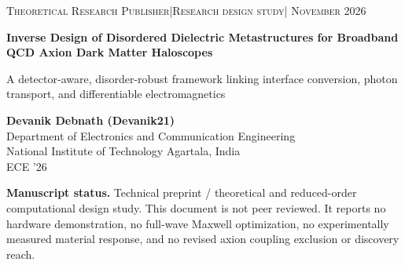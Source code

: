 \documentclass[10.5pt,a4paper]{article}
\begin{document}
\begin{titlepage}
\vspace*{0.25in}
{\small\color{accent}\textsc{Theoretical Research Publisher\quad |\quad Research design study\quad | November 2026}}\\[1.2em]
{\Huge\bfseries\color{ink} Inverse Design of Disordered Dielectric Metastructures for Broadband QCD \mbox{Axion} Dark Matter Haloscopes\par}
\vspace{0.7em}
{\Large\color{accent} A detector-aware, disorder-robust framework linking interface conversion, photon transport, and differentiable electromagnetics\par}
\vspace{1.8em}
{\large\bfseries Devanik Debnath (Devanik21)}\\[0.35em]
Department of Electronics and Communication Engineering\\
National Institute of Technology Agartala, India\\
ECE '26\\[1.4em]
\begin{minipage}{0.94\textwidth}
\textbf{Manuscript status.} Technical preprint / theoretical and reduced-order computational design study. This document is not peer reviewed. It reports no hardware demonstration, no full-wave Maxwell optimization, no experimentally measured material response, and no revised axion coupling exclusion or discovery reach.
\end{minipage}
\vfill
\begin{abstract}

\end{abstract}
\end{titlepage}
\end{document}

